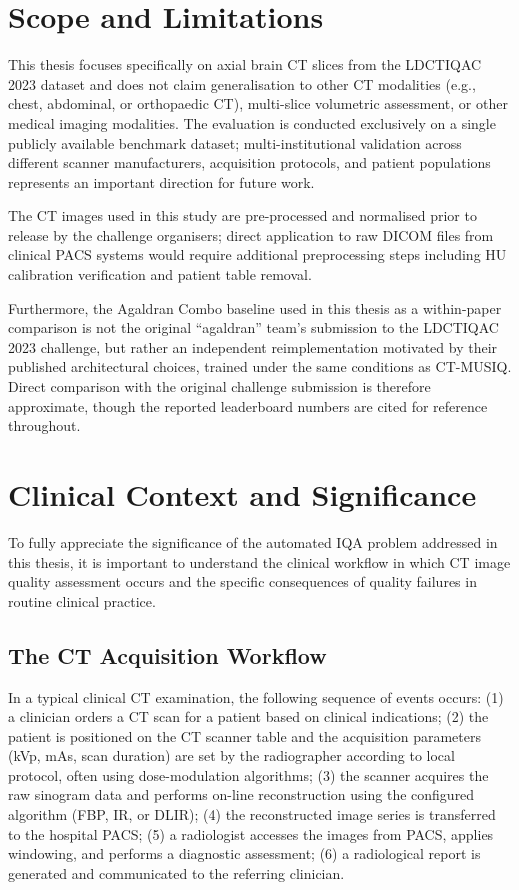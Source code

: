 \section{Scope and Limitations}
\label{sec:intro_scope}

This thesis focuses specifically on axial brain CT slices from the LDCTIQAC 2023 dataset
and does not claim generalisation to other CT modalities (e.g., chest, abdominal, or
orthopaedic CT), multi-slice volumetric assessment, or other medical imaging modalities.
The evaluation is conducted exclusively on a single publicly available benchmark dataset;
multi-institutional validation across different scanner manufacturers, acquisition
protocols, and patient populations represents an important direction for future work.

The CT images used in this study are pre-processed and normalised prior to release by the
challenge organisers; direct application to raw DICOM files from clinical PACS systems
would require additional preprocessing steps including HU calibration verification and
patient table removal.

Furthermore, the Agaldran Combo baseline used in this thesis as a within-paper comparison
is not the original ``agaldran'' team's submission to the LDCTIQAC 2023 challenge, but
rather an independent reimplementation motivated by their published architectural choices,
trained under the same conditions as CT-MUSIQ. Direct comparison with the original
challenge submission is therefore approximate, though the reported leaderboard numbers
are cited for reference throughout.


\section{Clinical Context and Significance}
\label{sec:intro_clinical}

To fully appreciate the significance of the automated IQA problem addressed in this
thesis, it is important to understand the clinical workflow in which CT image quality
assessment occurs and the specific consequences of quality failures in routine clinical
practice.

\subsection{The CT Acquisition Workflow}

In a typical clinical CT examination, the following sequence of events occurs: (1) a
clinician orders a CT scan for a patient based on clinical indications; (2) the patient
is positioned on the CT scanner table and the acquisition parameters (kVp, mAs, scan
duration) are set by the radiographer according to local protocol, often using
dose-modulation algorithms; (3) the scanner acquires the raw sinogram data and performs
on-line reconstruction using the configured algorithm (FBP, IR, or DLIR); (4) the
reconstructed image series is transferred to the hospital PACS; (5) a radiologist accesses
the images from PACS, applies windowing, and performs a diagnostic assessment;
(6) a radiological report is generated and communicated to the referring clinician.

